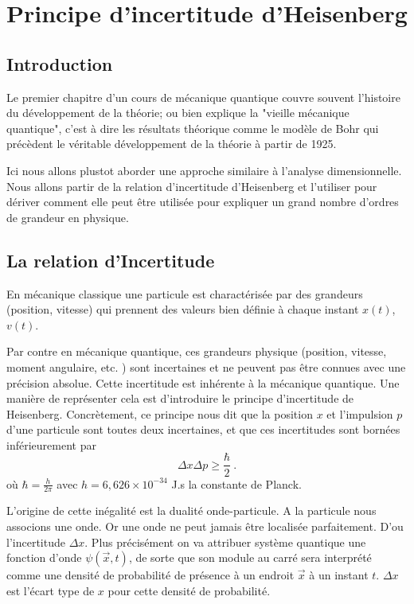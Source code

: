 \documentclass{book}
\begin{document}
\chapter{Principe d'incertitude d'Heisenberg}\label{chap:chap1}

\section{Introduction}

Le premier chapitre d'un cours de mécanique quantique couvre souvent l'histoire du développement de la théorie; ou bien explique la "vieille mécanique quantique", c'est à dire les résultats théorique comme le modèle de Bohr qui précèdent le véritable développement de la théorie à partir de 1925.

Ici nous allons plustot aborder une approche similaire à l'analyse dimensionnelle. Nous allons partir de la relation d'incertitude d'Heisenberg et l'utiliser pour dériver comment elle peut être utilisée pour expliquer un grand nombre d'ordres de grandeur en physique.

\section{La relation d'Incertitude}

En mécanique classique une particule est charactérisée par des grandeurs (position, vitesse) qui prennent des valeurs bien définie à chaque instant $x(t)$, $v(t)$.
 
Par contre en mécanique quantique, ces grandeurs physique (position, vitesse, moment angulaire, etc. ) sont incertaines et ne peuvent pas être connues avec une précision absolue. Cette incertitude est inhérente à la mécanique quantique. 
Une manière de représenter cela est d'introduire le principe d'incertitude de Heisenberg. 
Concrètement, ce principe nous dit que la position $x$ et l'impulsion $p$ d'une particule sont toutes deux incertaines, et que ces incertitudes sont bornées inférieurement par 
\begin{equation}
\label{Heinsenberg}
\Delta x \Delta p \geq \frac{\hbar}{2}\ .
\end{equation}
où $\hbar = \frac{h}{2\pi}$ avec $h = 6,626 \times 10^{-34}$ J.s la constante de Planck. 

L'origine de cette inégalité est la dualité onde-particule. A la particule nous associons une onde. Or une onde ne peut jamais être localisée parfaitement. D'ou l'incertitude $\Delta x$. Plus précisément on va  attribuer système quantique une fonction d'onde $\psi(\Vec{x},t)$, de sorte que son module au carré sera interprété comme une densité de probabilité de présence à un endroit $\Vec{x}$ à un instant $t$. $\Delta x$ est l'écart type de $x$ pour cette densité de probabilité. 
\end{document}
